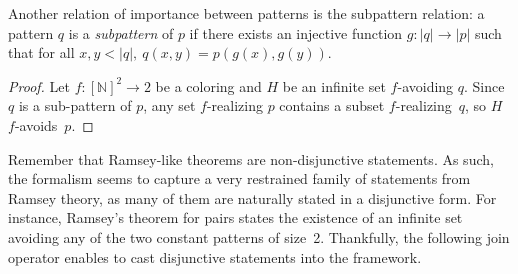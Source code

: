 \documentclass{article}
\def\W{\mathcal{W}}
\newcommand{\RCA}[0]{\mathsf{RCA}}
\newcommand{\RT}[0]{\mathsf{RT}}
\newcommand{\NN}[0]{\mathbb{N}}
\def\NN{\mathbb{N}}
\numberwithin{theorem}{section}
\newtheorem{lemma}[theorem]{Lemma}
\theoremstyle{definition}
\newtheorem{remark}[theorem]{Remark}
\begin{document}

Another relation of importance between patterns is the subpattern relation: a pattern $q$ is a \emph{subpattern} of $p$ if there exists an injective function $g : |q| \to |p|$ such that for all $x,y < |q|,\ q(x,y) = p(g(x),g(y))$. 

\begin{proof}
Let $f : [\NN]^2 \to 2$ be a coloring and $H$ be an infinite set $f$-avoiding $q$.
Since $q$ is a sub-pattern of $p$, any set $f$-realizing $p$ contains a subset $f$-realizing~$q$,
so $H$ $f$-avoids~$p$.
\end{proof}


Remember that Ramsey-like theorems are non-disjunctive statements. As such, the formalism seems to capture a very restrained family of statements from Ramsey theory, as many of them are naturally stated in a disjunctive form. For instance, Ramsey's theorem for pairs states the existence of an infinite set avoiding any of the two constant patterns of size~2. Thankfully, the following join operator enables to cast disjunctive statements into the framework.

\end{document}
